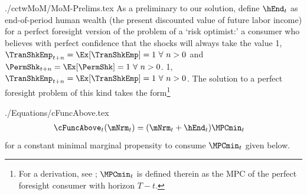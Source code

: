 \documentclass[titlepage, headings=optiontotocandhead]{\econtex}
\newcommand{\PermShkOn}{\ifthenelse{\boolean{PermShkVersion}}}
\begin{document}
\begin{verbatimwrite}{./cctwMoM/MoM-Prelims.tex}
  As a preliminary to our solution, define $\hEnd_{t}$ as
  end-of-period human wealth (the present discounted value
  of future labor income) for a perfect foresight version of the problem
  of a `risk optimist:' a consumer who believes with perfect confidence
  that the shocks will always take the value 
  \PermShkOn
  {1, $\TranShkEmp_{t+n} = \Ex[\TranShkEmp]=1~\forall~n>0$ and $\PermShk_{t+n} = \Ex[\PermShk]=1~\forall~n>0$.}
  {1, $\TranShkEmp_{t+n} = \Ex[\TranShkEmp]=1~\forall~n>0$.}
  The solution to a perfect foresight problem of this kind takes the
  form\footnote{For a derivation, see \cite{BufferStockTheory}; $\MPCmin_{t}$ is defined therein as the MPC of the perfect foresight consumer with horizon $T-t$.}
\end{verbatimwrite}
\unskip
\begin{verbatimwrite}{./Equations/cFuncAbove.tex}
  \begin{equation}\begin{gathered}\begin{aligned}
        \cFuncAbove_{t}(\mNrm_{t})  & = (\mNrm_{t} + \hEnd_{t})\MPCmin_{t} \label{eq:cFuncAbove}
      \end{aligned}\end{gathered}\end{equation}
  for a constant minimal marginal propensity to consume $\MPCmin_{t}$ given below.
\end{verbatimwrite}
\unskip
\end{document}
